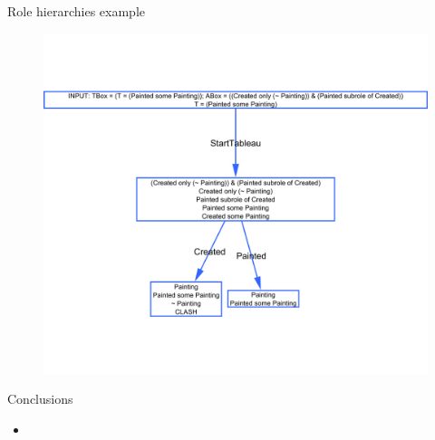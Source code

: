 \documentclass{beamer}
\begin{document}
\begin{frame}{Role hierarchies example}

\begin{figure}
\begin{center}
\includegraphics[scale=0.27]{premodelmetsubrole}
\end{center}
\end{figure}

\end{frame}



\begin{frame}{Conclusions}
\begin{itemize}
\item  
\end{itemize}
 
\end{frame}
\end{document}
